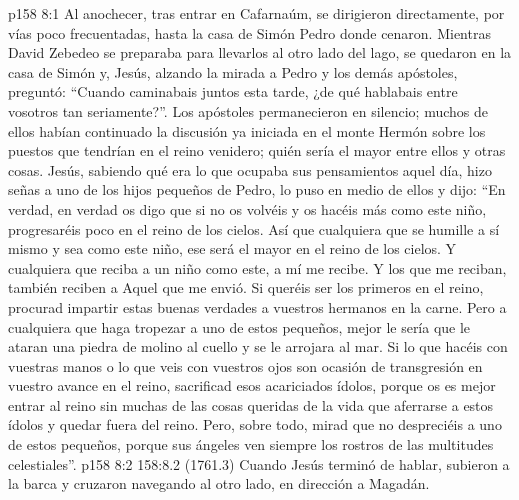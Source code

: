\vs p158 8:1 Al anochecer, tras entrar en Cafarnaúm, se dirigieron directamente, por vías poco frecuentadas, hasta la casa de Simón Pedro donde cenaron. Mientras David Zebedeo se preparaba para llevarlos al otro lado del lago, se quedaron en la casa de Simón y, Jesús, alzando la mirada a Pedro y los demás apóstoles, preguntó: “Cuando caminabais juntos esta tarde, ¿de qué hablabais entre vosotros tan seriamente?”. Los apóstoles permanecieron en silencio; muchos de ellos habían continuado la discusión ya iniciada en el monte Hermón sobre los puestos que tendrían en el reino venidero; quién sería el mayor entre ellos y otras cosas. Jesús, sabiendo qué era lo que ocupaba sus pensamientos aquel día, hizo señas a uno de los hijos pequeños de Pedro, lo puso en medio de ellos y dijo: “En verdad, en verdad os digo que si no os volvéis y os hacéis más como este niño, progresaréis poco en el reino de los cielos. Así que cualquiera que se humille a sí mismo y sea como este niño, ese será el mayor en el reino de los cielos. Y cualquiera que reciba a un niño como este, a mí me recibe. Y los que me reciban, también reciben a Aquel que me envió. Si queréis ser los primeros en el reino, procurad impartir estas buenas verdades a vuestros hermanos en la carne. Pero a cualquiera que haga tropezar a uno de estos pequeños, mejor le sería que le ataran una piedra de molino al cuello y se le arrojara al mar. Si lo que hacéis con vuestras manos o lo que veis con vuestros ojos son ocasión de transgresión en vuestro avance en el reino, sacrificad esos acariciados ídolos, porque os es mejor entrar al reino sin muchas de las cosas queridas de la vida que aferrarse a estos ídolos y quedar fuera del reino. Pero, sobre todo, mirad que no despreciéis a uno de estos pequeños, porque sus ángeles ven siempre los rostros de las multitudes celestiales”.
\vs p158 8:2 158:8.2 (1761.3) Cuando Jesús terminó de hablar, subieron a la barca y cruzaron navegando al otro lado, en dirección a Magadán.
